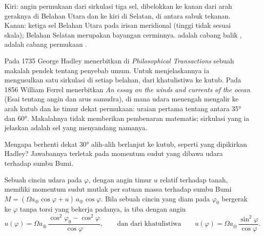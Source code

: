 \begin{omfigure}
{\small Kiri: angin permukaan dari sirkulasi tiga sel, dibelokkan ke kanan dari arah geraknya di Belahan Utara dan ke kiri di Selatan, di antara sabuk tekanan. Kanan: ketiga sel Belahan Utara pada irisan meridional (tinggi tidak sesuai skala); Belahan Selatan merupakan bayangan cerminnya.  adalah cabang balik ,  adalah cabang permukaan .}
\label{fig:b1:atmospheric-circulation:three-cells}
\end{omfigure}

\begin{history}
Pada 1735 George Hadley menerbitkan di \emph{Philosophical Transactions} sebuah makalah pendek tentang penyebab  umum. Untuk menjelaskannya ia mengusulkan satu sirkulasi di setiap belahan, dari khatulistiwa ke kutub.
Pada 1856 William Ferrel menerbitkan \emph{An essay on the winds and currents of the ocean} (Esai tentang angin dan arus samudra), di mana udara  menengah mengalir ke arah kutub dan ke timur dekat permukaan: uraian pertama tentang  antara \ang{35} dan \ang{60}. Makalahnya tidak memberikan pembenaran matematis; sirkulasi yang ia jelaskan adalah sel yang menyandang namanya.
\end{history}

Mengapa  berhenti dekat \ang{30} alih-alih berlanjut ke kutub, seperti yang dipikirkan Hadley? Jawabannya terletak pada momentum sudut yang dibawa udara terhadap sumbu Bumi.

\begin{proposition}\label{prop:b1:atmospheric-circulation:angular-momentum}
Sebuah cincin udara pada  $\varphi$, dengan angin timur $u$ relatif terhadap tanah,
memiliki momentum sudut mutlak per satuan massa terhadap sumbu Bumi $M =
(\Omega a_\oplus\cos\varphi + u)\,a_\oplus\cos\varphi$. Bila sebuah cincin yang diam pada
 $\varphi_0$ bergerak ke $\varphi$ tanpa torsi yang bekerja padanya, ia tiba dengan angin
\[
  u(\varphi) = \Omega a_\oplus\,\frac{\cos^2\varphi_0 - \cos^2\varphi}{\cos\varphi},
  \qquad\text{dan dari khatulistiwa}\qquad
  u(\varphi) = \Omega a_\oplus\,\frac{\sin^2\varphi}{\cos\varphi} .
\]
\end{proposition}

